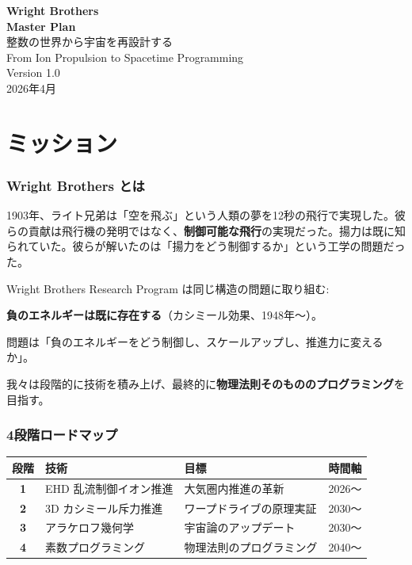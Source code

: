 \documentclass[11pt,a4paper]{article}
\begin{document}
\begin{center}
\vspace*{2cm}
{\fontsize{36pt}{40pt}\selectfont\bfseries Wright Brothers}\\[1cm]
{\LARGE\bfseries Master Plan}\\[0.5cm]
{\Large 整数の世界から宇宙を再設計する}\\[2cm]
{\large From Ion Propulsion to Spacetime Programming}\\[1cm]
{\large Version 1.0}\\[0.5cm]
{2026年4月}
\vspace*{2cm}
\end{center}

\newpage
\tableofcontents
\newpage

\part{ミッション}

\section{Wright Brothers とは}

1903年、ライト兄弟は「空を飛ぶ」という人類の夢を12秒の飛行で実現した。彼らの貢献は飛行機の発明ではなく、\textbf{制御可能な飛行}の実現だった。揚力は既に知られていた。彼らが解いたのは「揚力をどう制御するか」という工学の問題だった。

Wright Brothers Research Program は同じ構造の問題に取り組む:

\begin{planbox}[ミッション]
\textbf{負のエネルギーは既に存在する}（カシミール効果、1948年〜）。

問題は「負のエネルギーをどう制御し、スケールアップし、推進力に変えるか」。

我々は段階的に技術を積み上げ、最終的に\textbf{物理法則そのもののプログラミング}を目指す。
\end{planbox}

\section{4段階ロードマップ}

\begin{center}
\renewcommand{\arraystretch}{1.6}
\begin{tabular}{clll}
\toprule
段階 & 技術 & 目標 & 時間軸 \\
\midrule
\textbf{1} & EHD 乱流制御イオン推進 & 大気圏内推進の革新 & 2026〜 \\
\textbf{2} & 3D カシミール斥力推進 & ワープドライブの原理実証 & 2030〜 \\
\textbf{3} & アラケロフ幾何学 & 宇宙論のアップデート & 2030〜 \\
\textbf{4} & 素数プログラミング & 物理法則のプログラミング & 2040〜 \\
\bottomrule
\end{tabular}
\end{center}
\end{document}
